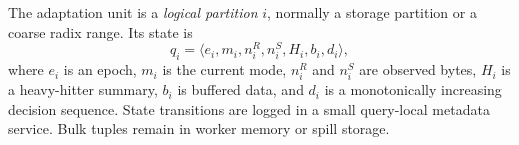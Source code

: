 The adaptation unit is a \emph{logical partition} $i$, normally a storage
partition or a coarse radix range.  Its state is
\[
 q_i=\langle e_i,m_i,n^R_i,n^S_i,H_i,b_i,d_i\rangle,
\]
where $e_i$ is an epoch, $m_i$ is the current mode, $n^R_i$ and $n^S_i$ are
observed bytes, $H_i$ is a heavy-hitter summary, $b_i$ is buffered data, and
$d_i$ is a monotonically increasing decision sequence.  State transitions are
logged in a small query-local metadata service.  Bulk tuples remain in worker
memory or spill storage.
